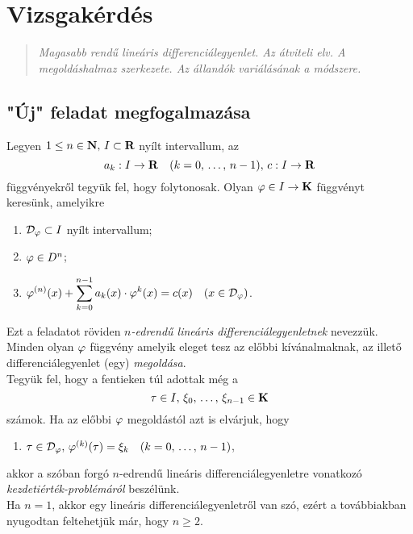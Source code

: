 \newpage
\section{Vizsgakérdés}
\begin{quote}
	\textit{Magasabb rendű lineáris differenciálegyenlet. Az átviteli elv. A megoldáshalmaz szerkezete. Az állandók variálásának a módszere.}
\end{quote}

\subsection{"Új" feladat megfogalmazása}
Legyen $1 \leq n \in \mathbf{N}, \, I \subset \mathbf{R}$ nyílt intervallum, az
\[
	a_k : I \to \mathbf{R} \quad (k = 0, \, \dots, \, n-1), \, c: I \to \mathbf{R}
\]
függvényekről tegyük fel, hogy folytonosak. Olyan $\varphi \in I \to \mathbf{K}$ függvényt keresünk, amelyikre
\begin{enumerate}
	\item $\mathcal{D}_\varphi \subset I$ nyílt intervallum;
	\item $\varphi \in D^n$;
	\item $\displaystyle \varphi^{(n)}(x) + \sum_{k=0}^{n-1} a_k(x) \cdot \varphi^{k}(x) = c(x) \quad (x \in \mathcal{D}_\varphi)$.
\end{enumerate}
Ezt a feladatot röviden \textit{$n$-edrendű lineáris differenciálegyenletnek} nevezzük. Minden olyan $\varphi$ függvény amelyik eleget tesz az előbbi kívánalmaknak, az illető differenciálegyenlet (egy) \textit{megoldása}.\\

Tegyük fel, hogy a fentieken túl adottak még a
\[
	\tau \in I, \, \xi_0, \, \dots, \, \xi_{n-1} \in \mathbf{K}
\]
számok. Ha az előbbi $\varphi$ megoldástól azt is elvárjuk, hogy
\begin{enumerate}[start=4]
	\item $\tau \in \mathcal{D}_\varphi, \, \varphi^{(k)}(\tau) = \xi_k \quad (k = 0, \, \dots, \, n-1)$,
\end{enumerate}
akkor a szóban forgó $n$-edrendű lineáris differenciálegyenletre vonatkozó \textit{kezdetiérték-problémáról} beszélünk.\\

Ha $n=1$, akkor egy lineáris differenciálegyenletről van szó, ezért a továbbiakban nyugodtan feltehetjük már, hogy $n \geq 2$.\\

